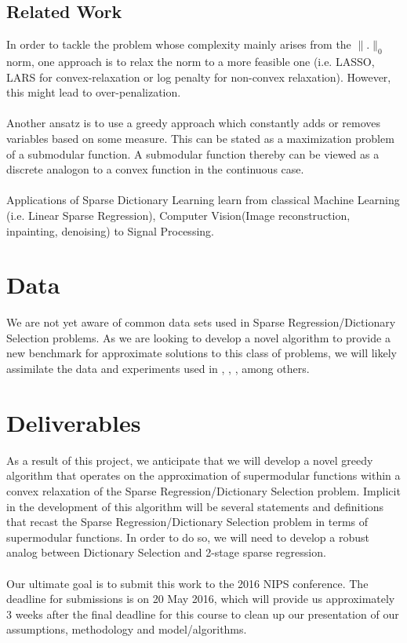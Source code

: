 \documentclass{article}
\begin{document}
\subsection{Related Work}
In order to tackle the problem whose complexity mainly arises from the $\| .\|_0$ norm, one approach is to relax the norm to a more feasible one (i.e. LASSO, LARS for convex-relaxation or log penalty for non-convex relaxation). However, this might lead to over-penalization\cite{nonconvexrelax}.
\\
\\
Another ansatz is to use a greedy approach which constantly adds or removes variables based on some measure\cite{submod_spectral}.  This can be stated as a maximization problem of a submodular function. A submodular function thereby can be viewed as a discrete analogon to a convex function in the continuous case\cite{submod_sparsecoding}.
\\
\\
Applications of Sparse Dictionary Learning learn from classical Machine Learning (i.e. Linear Sparse Regression), Computer Vision(Image reconstruction, inpainting, denoising) to Signal Processing\cite{nonconvexrelax}\cite{submod_sparsecoding}.

\section{Data}
We are not yet aware of common data sets used in Sparse Regression/Dictionary Selection problems. As we are looking to develop a novel algorithm to provide a new benchmark for approximate solutions to this class of problems, we will likely assimilate the data and experiments used in  \cite{submod_spectral}, \cite{greedy_selection}, \cite{rIBP}, among others. 

\section{Deliverables} \label{methods}
As a result of this project, we anticipate that we will develop a novel greedy algorithm that operates on the approximation of supermodular functions within a convex relaxation of the Sparse Regression/Dictionary Selection problem. Implicit in the development of this algorithm will be several statements and definitions that recast the Sparse Regression/Dictionary Selection problem in terms of supermodular functions. In order to do so, we will need to develop a robust analog between Dictionary Selection and 2-stage sparse regression.
\\
\\
Our ultimate goal is to submit this work to the 2016 NIPS conference. The deadline for submissions is on 20 May 2016, which will provide us approximately 3 weeks after the final deadline for this course to clean up our presentation of our assumptions, methodology and model/algorithms.
\end{document}
